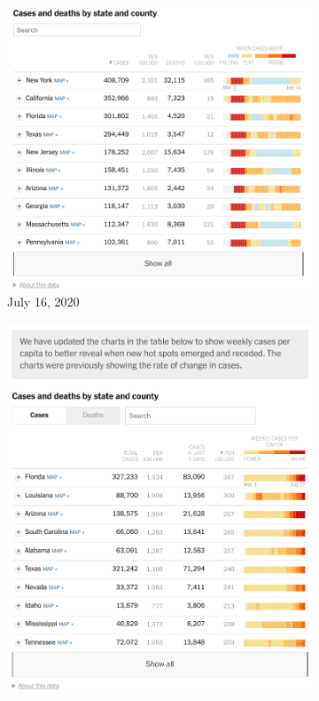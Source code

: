 \documentclass[article]{jdssv}\usepackage[]{graphicx}\usepackage[]{color}
\begin{document}
\begin{figure}
\begin{subfigure}[t]{.25\textwidth}
\includegraphics[width=\textwidth]{nyt-wayback-20200716}
\caption{July 16, 2020}\label{fig:nyt-colors2}
\end{subfigure}\hfill
\begin{subfigure}[t]{.25\textwidth}
\includegraphics[width=\textwidth]{nyt-wayback-20200718}

\end{subfigure}
\end{figure}
\end{document}
